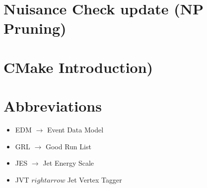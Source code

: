 \section{Nuisance Check update (NP Pruning)}


\section{CMake Introduction)}
%
%  
%  
%  




\section{Abbreviations}
\begin{itemize} 
\item EDM $\rightarrow$ Event Data Model 
\item GRL $\rightarrow$ Good Run List 
\item JES $\rightarrow$ Jet Energy Scale
\item JVT $rightarrow$  Jet Vertex Tagger
\end{itemize}




